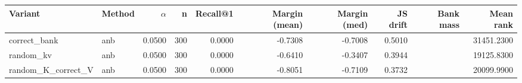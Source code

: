 \begin{tabular}{l l r r r r r r r r}
\toprule
Variant & Method & $\alpha$ & n & Recall@1 & Margin (mean) & Margin (med) & JS drift & Bank mass & Mean rank \\
\midrule
correct\_bank & anb & 0.0500 & 300 & 0.0000 & -0.7308 & -0.7008 & 0.5010 &  & 31451.2300 \\
random\_kv & anb & 0.0500 & 300 & 0.0000 & -0.6410 & -0.3407 & 0.3944 &  & 19125.8300 \\
random\_K\_correct\_V & anb & 0.0500 & 300 & 0.0000 & -0.8051 & -0.7109 & 0.3732 &  & 20099.9900 \\
\bottomrule
\end{tabular}
